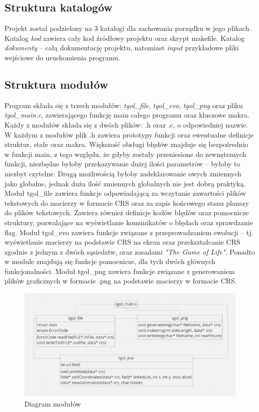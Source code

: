\documentclass[11pt,a4paper]{report}
\begin{document}
\subsection {Struktura katalogów}
Projekt został podzielony na 3 katalogi dla zachowania porządku w jego plikach. Katalog \textsl{kod} zawiera cały kod źródłowy projektu oraz skrypt makefile. Katalog \textsl{dokumenty} -- całą dokumentację projektu, natomiast \textsl{input} przykładowe pliki wejściowe do uruchomienia programu.
\subsection {Struktura modułów}
Program składa się z trzech modułów: \textsl{tgol\_file}, \textsl{tgol\_evo}, \textsl{tgol\_png} oraz pliku \textsl{tgol\_main.c}, zawierającego funkcję main całego programu oraz kluczowe makra.
Każdy z modułów składa się z dwóch plików: .h oraz .c, o odpowiedniej nazwie. W każdym z modułów plik .h zawiera prototypy funkcji oraz ewentualne definicje struktur, stałe oraz makra.
Większość obsługi błędów znajduje się bezpośrednio w funkcji main, z tego względu, że gdyby zostały przeniesione do zewnętrznych funkcji, niezbędne byłoby przekazywanie dużej ilości parametrów -- byłoby to niezbyt czytelne. Drugą możliwością byłoby zadeklarowanie owych zmiennych jako globalne, jednak duża ilość zmiennych globalnych nie jest dobrą praktyką.
Moduł tgol\_file zawiera funkcje odpowiadającą za wczytanie zawartości plików tekstowych do macierzy w formacie CRS oraz za zapis końcowego stanu planszy do plików tekstowych. Zawiera również definicje kodów błędów oraz pomocnicze struktury, pozwalające na wyświetlanie komunikatów o błędach oraz sprawdzanie flag.
Moduł tgol\_evo zawiera funkcje związane z przeprowadzaniem ewolucji -- tj. wyświetlanie macierzy na podstawie CRS na ekran oraz przekształcanie CRS zgodnie z jednym z dwóch sąsiedztw, oraz zasadami \textsl{"The Game of Life"}. Ponadto w module znajdują się funkcje pomocnicze, dla tych dwóch głównych funkcjonalności.
Moduł tgol\_png zawiera funkcje związane z generowaniem plików graficznych w formacie .png na podstawie macierzy w formacie CRS.
\begin{figure}[!ht]
\centerline{\includegraphics{img/diagram.png}}
\caption{Diagram modułów}
\end{figure}
\newpage
\end{document}
